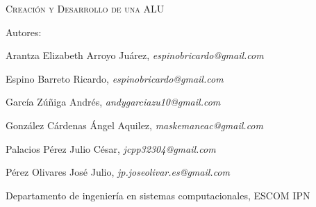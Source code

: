 \documentclass[a4paper,12pt]{article}
\begin{document}
\begin{center}
\vspace{2cm}
    {\textsc{\Huge Creación y Desarrollo de una ALU}\par}
    \vspace{0.5cm}
    {\large
        Autores:\par
    Arantza Elizabeth Arroyo Juárez, \textit{espinobricardo@gmail.com}\par
    Espino Barreto Ricardo, \textit{espinobricardo@gmail.com}\par
    García Zúñiga Andrés, \textit{andygarciazu10@gmail.com}\par
    González Cárdenas Ángel Aquilez, \textit{maskemaneac@gmail.com}\par
    Palacios Pérez Julio César, \textit{jcpp32304@gmail.com}\par
    Pérez Olivares José Julio, \textit{jp.joseolivar.es@gmail.com}\par
    }

\vspace{.5cm}

{\footnotesize Departamento de ingeniería en sistemas computacionales, ESCOM IPN\par}

\vspace{.5cm}
    
\end{center}

\begin{multicols}{2}

\end{multicols}
\end{document}
